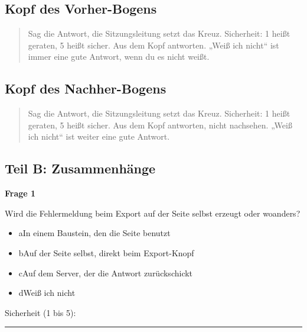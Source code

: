 \subsection*{Kopf des Vorher-Bogens}

\begin{quote}
Sag die Antwort, die Sitzungsleitung setzt das Kreuz. Sicherheit: 1 heißt geraten, 5 heißt sicher. Aus dem Kopf antworten. „Weiß ich nicht“ ist immer eine gute Antwort, wenn du es nicht weißt.

\end{quote}

\subsection*{Kopf des Nachher-Bogens}

\begin{quote}
Sag die Antwort, die Sitzungsleitung setzt das Kreuz. Sicherheit: 1 heißt geraten, 5 heißt sicher. Aus dem Kopf antworten, nicht nachsehen. „Weiß ich nicht“ ist weiter eine gute Antwort.

\end{quote}

\subsection*{Teil B: Zusammenhänge}

\noindent\begin{minipage}{\linewidth}
\textbf{Frage 1}\par
Wird die Fehlermeldung beim Export auf der Seite selbst erzeugt oder woanders?

\begin{itemize}[nosep,leftmargin=2.4em]
\item[\kreuz] a\quad In einem Baustein, den die Seite benutzt
\item[\kreuz] b\quad Auf der Seite selbst, direkt beim Export-Knopf
\item[\kreuz] c\quad Auf dem Server, der die Antwort zurückschickt
\item[\kreuz] d\quad Weiß ich nicht
\end{itemize}
\noindent Sicherheit (1 bis 5):~\rule{2.5em}{0.4pt}\par
\end{minipage}

\medskip

